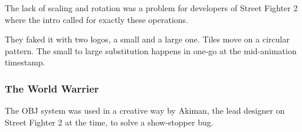 \begin{minipage}[t]{0.32\linewidth}
\end{minipage}%
\hfill%
\begin{minipage}[t]{0.32\linewidth}
\end{minipage}
\hfill%
\begin{minipage}[t]{0.32\linewidth}
\end{minipage}

\begin{minipage}[t]{0.32\linewidth}
\end{minipage}%
\hfill%
\begin{minipage}[t]{0.32\linewidth}
\end{minipage}
\hfill%
\begin{minipage}[t]{0.32\linewidth}
\end{minipage}

\begin{minipage}[t]{0.32\linewidth}
\end{minipage}%
\hfill%
\begin{minipage}[t]{0.32\linewidth}
\end{minipage}
\hfill%
\begin{minipage}[t]{0.32\linewidth}
\end{minipage}

The lack of scaling and rotation was a problem for developers of Street Fighter 2 where the intro called for exactly these operations. 

They faked it with two logos, a small and a large one. Tiles move on a circular pattern. The small to large substitution happens in one-go at the mid-animation timestamp.

\pagebreak











\subsubsection{The World Warrier}
The OBJ system was used in a creative way by Akiman, the lead designer on Street Fighter 2 at the time, to solve a show-stopper bug.

